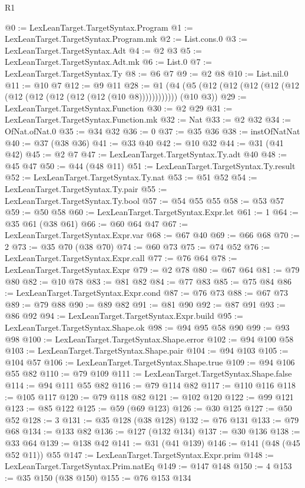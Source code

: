 \begin{lexlean}{R1}
\begin{coremodule}
{{{{{{{{{{{{{{{{{{{{{{{{{{{{{{{{{{{{{{{{{{{{{{{{{{@0 := LexLeanTarget.TargetSyntax.Program
@1 := LexLeanTarget.TargetSyntax.Program.mk
@2 := List.cons.{0}
@3 := LexLeanTarget.TargetSyntax.Adt
@4 := @2 @3
@5 := LexLeanTarget.TargetSyntax.Adt.mk
@6 := List.{0}
@7 := LexLeanTarget.TargetSyntax.Ty
@8 := @6 @7
@9 := @2 @8
@10 := List.nil.{0}
@11 := @10 @7
@12 := @9 @11
@28 := @1 (@4 (@5 (@12 (@12 (@12 (@12 (@12 (@12 (@12 (@12 (@12 (@12 (@10 @8)))))))))))) (@10 @3))
@29 := LexLeanTarget.TargetSyntax.Function
@30 := @2 @29
@31 := LexLeanTarget.TargetSyntax.Function.mk
@32 := Nat
@33 := @2 @32
@34 := OfNat.ofNat.{0}
@35 := @34 @32
@36 := 0
@37 := @35 @36
@38 := instOfNatNat
@40 := @37 (@38 @36)
@41 := @33 @40
@42 := @10 @32
@44 := @31 (@41 @42)
@45 := @2 @7
@47 := LexLeanTarget.TargetSyntax.Ty.adt @40
@48 := @45 @47
@50 := @44 (@48 @11)
@51 := LexLeanTarget.TargetSyntax.Ty.result
@52 := LexLeanTarget.TargetSyntax.Ty.nat
@53 := @51 @52
@54 := LexLeanTarget.TargetSyntax.Ty.pair
@55 := LexLeanTarget.TargetSyntax.Ty.bool
@57 := @54 @55 @55
@58 := @53 @57
@59 := @50 @58
@60 := LexLeanTarget.TargetSyntax.Expr.let
@61 := 1
@64 := @35 @61 (@38 @61)
@66 := @60 @64 @47
@67 := LexLeanTarget.TargetSyntax.Expr.var
@68 := @67 @40
@69 := @66 @68
@70 := 2
@73 := @35 @70 (@38 @70)
@74 := @60 @73
@75 := @74 @52
@76 := LexLeanTarget.TargetSyntax.Expr.call
@77 := @76 @64
@78 := LexLeanTarget.TargetSyntax.Expr
@79 := @2 @78
@80 := @67 @64
@81 := @79 @80
@82 := @10 @78
@83 := @81 @82
@84 := @77 @83
@85 := @75 @84
@86 := LexLeanTarget.TargetSyntax.Expr.cond
@87 := @76 @73
@88 := @67 @73
@89 := @79 @88
@90 := @89 @82
@91 := @81 @90
@92 := @87 @91
@93 := @86 @92
@94 := LexLeanTarget.TargetSyntax.Expr.build
@95 := LexLeanTarget.TargetSyntax.Shape.ok
@98 := @94 @95 @58 @90
@99 := @93 @98
@100 := LexLeanTarget.TargetSyntax.Shape.error
@102 := @94 @100 @58
@103 := LexLeanTarget.TargetSyntax.Shape.pair
@104 := @94 @103
@105 := @104 @57
@106 := LexLeanTarget.TargetSyntax.Shape.true
@109 := @94 @106 @55 @82
@110 := @79 @109
@111 := LexLeanTarget.TargetSyntax.Shape.false
@114 := @94 @111 @55 @82
@116 := @79 @114 @82
@117 := @110 @116
@118 := @105 @117
@120 := @79 @118 @82
@121 := @102 @120
@122 := @99 @121
@123 := @85 @122
@125 := @59 (@69 @123)
@126 := @30 @125
@127 := @50 @52
@128 := 3
@131 := @35 @128 (@38 @128)
@132 := @76 @131
@133 := @79 @68
@134 := @133 @82
@136 := @127 (@132 @134)
@137 := @30 @136
@138 := @33 @64
@139 := @138 @42
@141 := @31 (@41 @139)
@146 := @141 (@48 (@45 @52 @11)) @55
@147 := LexLeanTarget.TargetSyntax.Expr.prim
@148 := LexLeanTarget.TargetSyntax.Prim.natEq
@149 := @147 @148
@150 := 4
@153 := @35 @150 (@38 @150)
@155 := @76 @153 @134
}}}}}}}}}}}}}}}}}}}}}}}}}}}}}}}}}}}}}}}}}}}}}}}}}}
\end{coremodule}
\end{lexlean}
